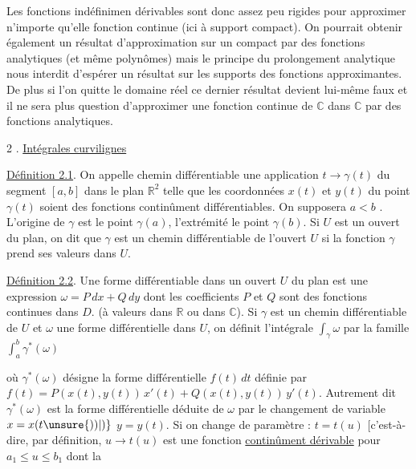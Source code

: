 
Les fonctions indéfinimen dérivables sont donc assez peu rigides
pour approximer n'importe qu'elle fonction continue (ici à support compact).
On pourrait obtenir également un résultat d'approximation sur un compact par
des fonctions analytiques (et même polynômes) mais le principe du prolongement
analytique nous interdit d'espérer un résultat sur les supports des fonctions
approximantes.
De plus si l'on quitte le domaine réel ce dernier résultat devient lui-même
faux et il ne sera plus question d'approximer une fonction continue de $\mathbb{C}$
dans $\mathbb{C}$ par des fonctions analytiques.

2 . \uline{Intégrales curvilignes}

\uline{Définition 2.1}. On appelle chemin différentiable une application $t \to \gamma(t)$
du segment $[a,b]$ dans le plan $\mathbb{R}^2$ telle que les coordonnées $x(t)$ et $y(t)$
du point $\gamma(t)$ soient des fonctions continûment différentiables. On supposera
$a < b$ . L'origine de $\gamma$ est le point $\gamma(a)$, l'extrémité le point $\gamma(b)$.
Si $U$ est un ouvert du plan, on dit que $\gamma$ est un chemin différentiable de
l'ouvert $U$ si la fonction $\gamma$ prend ses valeurs dans $U$.

\uline{Définition 2.2}. Une forme différentiable dans un ouvert $U$ du plan est une
expression $\omega = P\,dx + Q\,dy$ dont les coefficients $P$ et $Q$ sont des fonctions
continues dans $D$. (à valeurs dans $\mathbb{R}$ ou dans $\mathbb{C}$). Si $\gamma$ est un chemin
différentiable de $U$ et $\omega$ une forme différentielle dans $U$, on définit
l'intégrale $\int_\gamma \omega$ par la famille $\int_a^b \gamma^*(\omega)$

où $\gamma^*(\omega)$ désigne la forme différentielle $f(t)\,dt$ définie par
$f(t) = P(x(t), y(t))\, x'(t) + Q(x(t), y(t))\, y'(t)$. Autrement dit $\gamma^*(\omega)$ est
la forme différentielle déduite de $\omega$ par le changement de variable $x = x(t\unsure{))|)}$
$y = y(t)$. Si on change de paramètre : $t = t(u)$ [c'est-à-dire, par définition,
$u \to t(u)$ est une fonction \uline{continûment dérivable} pour $a_1 \leq u \leq b_1$ dont la

